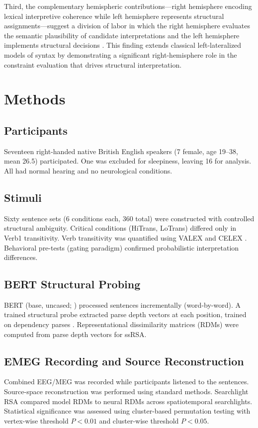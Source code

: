 \documentclass[11pt]{article}
\begin{document}
Third, the complementary hemispheric contributions---right hemisphere encoding lexical interpretive coherence while left hemisphere represents structural assignments---suggest a division of labor in which the right hemisphere evaluates the semantic plausibility of candidate interpretations and the left hemisphere implements structural decisions \citep{pylkkanen2019neural}. This finding extends classical left-lateralized models of syntax by demonstrating a significant right-hemisphere role in the constraint evaluation that drives structural interpretation.

\section{Methods}

\subsection{Participants}
Seventeen right-handed native British English speakers (7 female, age 19--38, mean 26.5) participated. One was excluded for sleepiness, leaving 16 for analysis. All had normal hearing and no neurological conditions.

\subsection{Stimuli}
Sixty sentence sets (6 conditions each, 360 total) were constructed with controlled structural ambiguity. Critical conditions (HiTrans, LoTrans) differed only in Verb1 transitivity. Verb transitivity was quantified using VALEX \citep{koller2003valex} and CELEX \citep{baayen1995celex}. Behavioral pre-tests (gating paradigm) confirmed probabilistic interpretation differences.

\subsection{BERT Structural Probing}
BERT (base, uncased; \citealt{devlin2019bert}) processed sentences incrementally (word-by-word). A trained structural probe \citep{hewitt2019structural} extracted parse depth vectors at each position, trained on dependency parses \citep{demarneffe2006generating}. Representational dissimilarity matrices (RDMs) were computed from parse depth vectors for ssRSA.

\subsection{EMEG Recording and Source Reconstruction}
Combined EEG/MEG was recorded while participants listened to the sentences. Source-space reconstruction was performed using standard methods. Searchlight RSA \citep{kriegeskorte2008representational} compared model RDMs to neural RDMs across spatiotemporal searchlights. Statistical significance was assessed using cluster-based permutation testing \citep{maris2007nonparametric} with vertex-wise threshold $P < 0.01$ and cluster-wise threshold $P < 0.05$.
\end{document}
